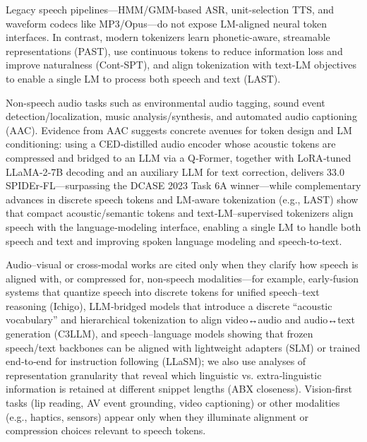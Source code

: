 \documentclass{article}
\begin{document}
  \item Legacy speech pipelines—HMM/GMM-based ASR, unit-selection TTS, and waveform codecs like MP3/Opus—do not expose LM-aligned neural token interfaces. In contrast, modern tokenizers learn phonetic-aware, streamable representations (PAST), use continuous tokens to reduce information loss and improve naturalness (Cont-SPT), and align tokenization with text-LM objectives to enable a single LM to process both speech and text (LAST). \cite{li2025continuousspeechtokenizertext,har-tuv2025pastphoneticacousticspeechtokenizer,turetzky2024lastlanguagemodelawarespeechtokenization}

  \item Non-speech audio tasks such as environmental audio tagging, sound event detection/localization, music analysis/synthesis, and automated audio captioning (AAC). Evidence from AAC suggests concrete avenues for token design and LM conditioning: using a CED‑distilled audio encoder whose acoustic tokens are compressed and bridged to an LLM via a Q‑Former, together with LoRA‑tuned LLaMA‑2‑7B decoding and an auxiliary LLM for text correction, delivers 33.0 SPIDEr‑FL—surpassing the DCASE 2023 Task 6A winner—while complementary advances in discrete speech tokens and LM‑aware tokenization (e.g., LAST) show that compact acoustic/semantic tokens and text‑LM–supervised tokenizers align speech with the language‑modeling interface, enabling a single LM to handle both speech and text and improving spoken language modeling and speech‑to‑text. \cite{guo2025recentadvancesdiscretespeechtokensreview,liu2024enhancingautomatedaudiocaptioninglargela,turetzky2024lastlanguagemodelawarespeechtokenization}

  \item Audio–visual or cross‑modal works are cited only when they clarify how speech is aligned with, or compressed for, non‑speech modalities—for example, early‑fusion systems that quantize speech into discrete tokens for unified speech–text reasoning (Ichigo), LLM‑bridged models that introduce a discrete “acoustic vocabulary” and hierarchical tokenization to align video↔audio and audio↔text generation (C3LLM), and speech–language models showing that frozen speech/text backbones can be aligned with lightweight adapters (SLM) or trained end‑to‑end for instruction following (LLaSM); we also use analyses of representation granularity that reveal which linguistic vs. extra‑linguistic information is retained at different snippet lengths (ABX closeness). Vision‑first tasks (lip reading, AV event grounding, video captioning) or other modalities (e.g., haptics, sensors) appear only when they illuminate alignment or compression choices relevant to speech tokens. \cite{dao2025ichigomixedmodalearlyfusionrealtimevoice,fily2024establishingdegreesclosenessbetweenaudio,shu2023llasmlargelanguagespeechmodel,wang2023slmbridgethingapbetweenspeechtextfoundat,wang2024c3llmconditionalmultimodalcontentgenerat}
\end{document}
